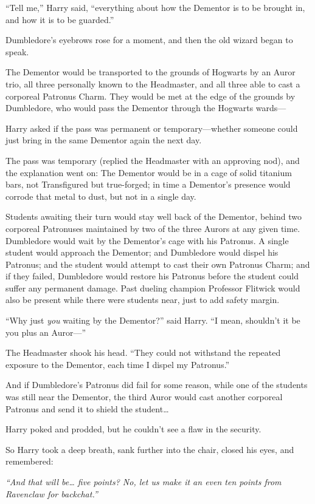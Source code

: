 ``Tell me,'' Harry said, ``everything about how the Dementor is to be
brought in, and how it is to be guarded.''

Dumbledore's eyebrows rose for a moment, and then the old wizard began
to speak.

The Dementor would be transported to the grounds of Hogwarts by an Auror
trio, all three personally known to the Headmaster, and all three able
to cast a corporeal Patronus Charm. They would be met at the edge of the
grounds by Dumbledore, who would pass the Dementor through the Hogwarts
wards---

Harry asked if the pass was permanent or temporary---whether someone
could just bring in the same Dementor again the next day.

The pass was temporary (replied the Headmaster with an approving nod),
and the explanation went on: The Dementor would be in a cage of solid
titanium bars, not Transfigured but true-forged; in time a Dementor's
presence would corrode that metal to dust, but not in a single day.

Students awaiting their turn would stay well back of the Dementor,
behind two corporeal Patronuses maintained by two of the three Aurors at
any given time. Dumbledore would wait by the Dementor's cage with his
Patronus. A single student would approach the Dementor; and Dumbledore
would dispel his Patronus; and the student would attempt to cast their
own Patronus Charm; and if they failed, Dumbledore would restore his
Patronus before the student could suffer any permanent damage. Past
dueling champion Professor Flitwick would also be present while there
were students near, just to add safety margin.

``Why just \emph{you} waiting by the Dementor?'' said Harry. ``I mean,
shouldn't it be you plus an Auror---''

The Headmaster shook his head. ``They could not withstand the repeated
exposure to the Dementor, each time I dispel my Patronus.''

And if Dumbledore's Patronus did fail for some reason, while one of the
students was still near the Dementor, the third Auror would cast another
corporeal Patronus and send it to shield the student\ldots{}

Harry poked and prodded, but he couldn't see a flaw in the security.

So Harry took a deep breath, sank further into the chair, closed his
eyes, and remembered:

\emph{``And that will be\ldots{} five points? No, let us make it an even
ten points from Ravenclaw for backchat.''}

